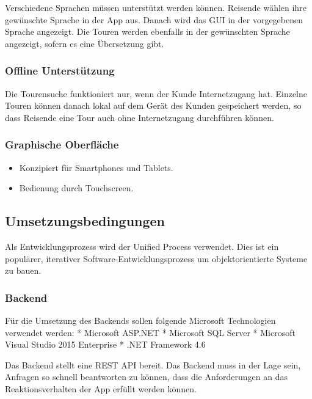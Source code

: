 \documentclass[a4paper,10pt,xetex]{article}
\begin{document}
Verschiedene Sprachen müssen unterstützt werden können. Reisende wählen
ihre gewünschte Sprache in der App aus. Danach wird das GUI in der
vorgegebenen Sprache angezeigt. Die Touren werden ebenfalls in der
gewünschten Sprache angezeigt, sofern es eine Übersetzung gibt.

\subsubsection{Offline Unterstützung}\label{offline-unterstuxfctzung}

Die Tourensuche funktioniert nur, wenn der Kunde Internetzugang hat.
Einzelne Touren können danach lokal auf dem Gerät des Kunden gespeichert
werden, so dass Reisende eine Tour auch ohne Internetzugang durchführen
können.

\subsubsection{Graphische Oberfläche}\label{graphische-oberfluxe4che}

\begin{itemize}
\tightlist
\item
  Konzipiert für Smartphones und Tablets.
\item
  Bedienung durch Touchscreen.
\end{itemize}

\subsection{Umsetzungsbedingungen}\label{umsetzungsbedingungen}

Als Entwicklungsprozess wird der Unified Process verwendet. Dies ist ein
populärer, iterativer Software-Entwicklungsprozess um objektorientierte
Systeme zu bauen.\cite{UP}

\subsubsection{Backend}\label{backend}

Für die Umsetzung des Backends sollen folgende Microsoft Technologien
verwendet werden: * Microsoft ASP.NET * Microsoft SQL Server * Microsoft
Visual Studio 2015 Enterprise * .NET Framework 4.6

Das Backend stellt eine REST API bereit. Das Backend muss in der Lage
sein, Anfragen so schnell beantworten zu können, dass die Anforderungen
an das Reaktionsverhalten der App erfüllt werden können.
\end{document}
